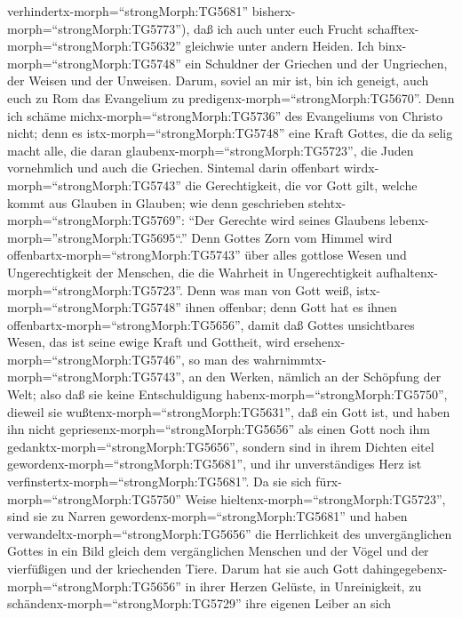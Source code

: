 verhindertx-morph=``strongMorph:TG5681''
bisherx-morph=``strongMorph:TG5773''), daß ich auch unter euch Frucht
schafftex-morph=``strongMorph:TG5632'' gleichwie unter andern Heiden.
 Ich binx-morph=``strongMorph:TG5748'' ein Schuldner der
Griechen und der Ungriechen, der Weisen und der Unweisen. 
Darum, soviel an mir ist, bin ich geneigt, auch euch zu Rom das
Evangelium zu predigenx-morph=``strongMorph:TG5670''.  Denn
ich schäme michx-morph=``strongMorph:TG5736'' des Evangeliums von
Christo nicht; denn es istx-morph=``strongMorph:TG5748'' eine Kraft
Gottes, die da selig macht alle, die daran
glaubenx-morph=``strongMorph:TG5723'', die Juden vornehmlich und auch
die Griechen.  Sintemal darin offenbart
wirdx-morph=``strongMorph:TG5743'' die Gerechtigkeit, die vor Gott gilt,
welche kommt aus Glauben in Glauben; wie denn geschrieben
stehtx-morph=``strongMorph:TG5769'': ``Der Gerechte wird seines Glaubens
lebenx-morph=''strongMorph:TG5695``.''  Denn Gottes Zorn
vom Himmel wird offenbartx-morph=``strongMorph:TG5743'' über alles
gottlose Wesen und Ungerechtigkeit der Menschen, die die Wahrheit in
Ungerechtigkeit aufhaltenx-morph=``strongMorph:TG5723''. 
Denn was man von Gott weiß, istx-morph=``strongMorph:TG5748'' ihnen
offenbar; denn Gott hat es ihnen
offenbartx-morph=``strongMorph:TG5656'',  damit daß Gottes
unsichtbares Wesen, das ist seine ewige Kraft und Gottheit, wird
ersehenx-morph=``strongMorph:TG5746'', so man des
wahrnimmtx-morph=``strongMorph:TG5743'', an den Werken, nämlich an der
Schöpfung der Welt; also daß sie keine Entschuldigung
habenx-morph=``strongMorph:TG5750'',  dieweil sie
wußtenx-morph=``strongMorph:TG5631'', daß ein Gott ist, und haben ihn
nicht gepriesenx-morph=``strongMorph:TG5656'' als einen Gott noch ihm
gedanktx-morph=``strongMorph:TG5656'', sondern sind in ihrem Dichten
eitel gewordenx-morph=``strongMorph:TG5681'', und ihr unverständiges
Herz ist verfinstertx-morph=``strongMorph:TG5681''.  Da sie
sich fürx-morph=``strongMorph:TG5750'' Weise
hieltenx-morph=``strongMorph:TG5723'', sind sie zu Narren
gewordenx-morph=``strongMorph:TG5681''  und haben
verwandeltx-morph=``strongMorph:TG5656'' die Herrlichkeit des
unvergänglichen Gottes in ein Bild gleich dem vergänglichen Menschen und
der Vögel und der vierfüßigen und der kriechenden Tiere. 
Darum hat sie auch Gott dahingegebenx-morph=``strongMorph:TG5656'' in
ihrer Herzen Gelüste, in Unreinigkeit, zu
schändenx-morph=``strongMorph:TG5729'' ihre eigenen Leiber an sich
